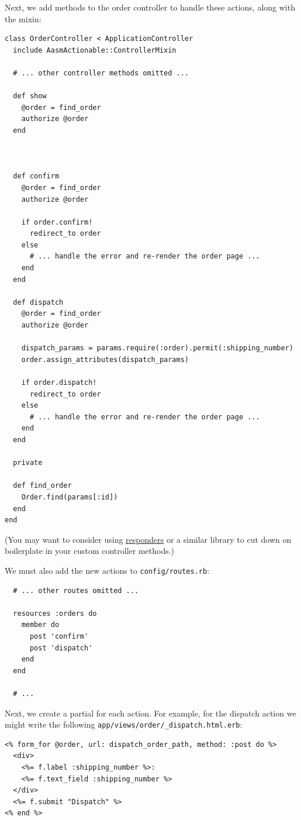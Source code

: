 \documentclass[document.tex]{subfiles}
\begin{document}
Next, we add methods to the order controller to handle these actions, along with the mixin:

\begin{lstlisting}
class OrderController < ApplicationController
  include AasmActionable::ControllerMixin

  # ... other controller methods omitted ...
  
  def show
    @order = find_order
    authorize @order
  end



  def confirm
    @order = find_order
    authorize @order

    if order.confirm!
      redirect_to order
    else
      # ... handle the error and re-render the order page ...
    end
  end
  
  def dispatch
    @order = find_order
    authorize @order
    
    dispatch_params = params.require(:order).permit(:shipping_number)
    order.assign_attributes(dispatch_params)

    if order.dispatch!
      redirect_to order
    else
      # ... handle the error and re-render the order page ...
    end
  end
  
  private
  
  def find_order
    Order.find(params[:id])
  end
end

\end{lstlisting}   %

(You may want to consider using \href{https://github.com/plataformatec/responders}{responders} or a similar library to cut down on boilerplate in your custom controller methods.)

\pagebreak

We must also add the new actions to {\tt config/routes.rb}:

\begin{lstlisting}
  # ... other routes omitted ...
  
  resources :orders do
    member do
      post 'confirm'
      post 'dispatch'
    end
  end
  
  # ...

\end{lstlisting}   %

Next, we create a partial for each action. For example, for the dispatch action we might write the following {\tt app/views/order/\_dispatch.html.erb}:

\begin{lstlisting}
<% form_for @order, url: dispatch_order_path, method: :post do %>
  <div>
    <%= f.label :shipping_number %>:
    <%= f.text_field :shipping_number %>
  </div>
  <%= f.submit "Dispatch" %>
<% end %>

\end{lstlisting}   %
\end{document}
